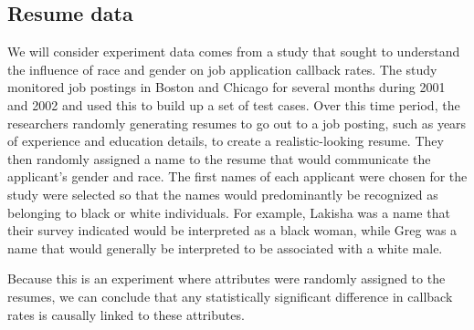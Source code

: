 
\subsection{Resume data}


\newcommand{\resN}{4870}
\newcommand{\resCallbackProp}{0.0805}
\newcommand{\resCallbackPerc}{8.05\%}
\newcommand{\resNumPred}{9}
\newcommand{\resUniqueNames}{36}
\newcommand{\resHonorsInt}{-2.4998}
\newcommand{\resHonorsCoef}{0.8668}
\newcommand{\resHonorsIntPlusCoef}{-1.6330}
\newcommand{\resHonorsCoefSE}{0.1776}
\newcommand{\resHonorsCoefZ}{4.88}
\newcommand{\resHonorsProb}{0.163}
\newcommand{\resHonorsPerc}{16.3\%}
\newcommand{\resHonorsNotProb}{0.076}
\newcommand{\resHonorsNotPerc}{7.6\%}

We will consider experiment data comes from a study that sought
to understand the influence of race and gender on job application
callback rates.
The study monitored job postings in Boston and Chicago for
several months during 2001 and 2002 and used this to build
up a set of test cases.
Over this time period, the researchers randomly generating
resumes to go out to a job posting, such as years of experience
and education details, to create a realistic-looking resume.
They then randomly assigned a name to the resume that would
communicate the applicant's gender and race.
The first names of each applicant were chosen for the study
were selected so that the names would predominantly be
recognized as belonging to black or white individuals.
For example, Lakisha was a name that their survey indicated
would be interpreted as a black woman, while Greg was a name
that would generally be interpreted to be associated with
a white male.

Because this is an experiment where attributes were
randomly assigned to the resumes, we can conclude that
any statistically significant difference in callback
rates is causally linked to these attributes.

